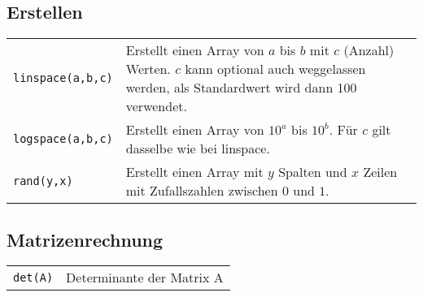 \subsection{Erstellen}
\begin{tabularx}{\textwidth}{p{3cm} p{15cm}}
    \texttt{linspace(a,b,c)} &
    Erstellt einen Array von $a$ bis $b$ mit $c$ (Anzahl) Werten. $c$ kann
    optional auch weggelassen werden, als Standardwert wird dann 100 verwendet.
  \\
    \texttt{logspace(a,b,c)} &
    Erstellt einen Array von $10^a$ bis $10^b$. Für $c$ gilt dasselbe wie bei
    linspace.
  \\
    \texttt{rand(y,x)} &
    Erstellt einen Array mit $y$ Spalten und $x$ Zeilen mit Zufallszahlen
    zwischen $0$ und $1$.
\end{tabularx}


\subsection{Matrizenrechnung}
\begin{tabular}{ll}
	\texttt{det(A)} & Determinante der Matrix A \\
\end{tabular}